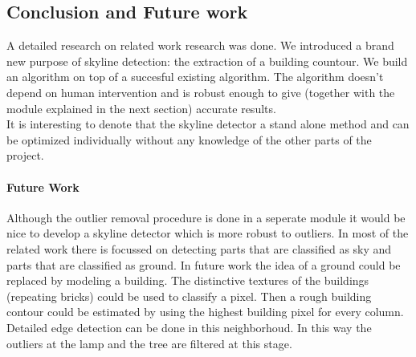 
\subsection{Conclusion and Future work}
A detailed research on related work research was done.
We introduced a brand new purpose of skyline detection: the extraction of a
building countour. We build an algorithm on top of a succesful existing
algorithm.  The algorithm doesn't depend on human intervention and is robust enough to give
(together with the module explained in the next section) accurate results.\\
It is interesting to denote that the skyline detector a stand alone method and
can be optimized individually without any knowledge of the other parts of the
project.

\paragraph{Future Work}
Although the outlier removal procedure is done in a seperate module it would be
nice to develop a skyline detector which is more robust to outliers.
In most of the related work there is focussed on detecting parts that are
classified as sky and parts that are classified as ground. In future work the
idea of a ground could be replaced by modeling a building. The distinctive
textures of the buildings (repeating bricks) could be used to classify a
pixel. Then a rough building contour could be estimated by using the
highest building pixel for every column. Detailed edge detection can be
done in this neighborhoud. In this way the outliers at the lamp and the tree are
filtered at this stage.




%






